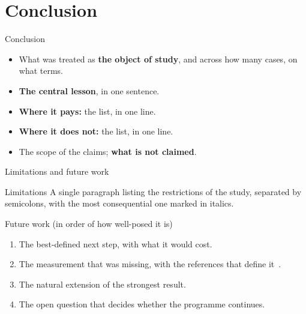 \documentclass[aspectratio=43, 11pt, xcolor=dvipsnames, compress]{beamer}
\renewcommand{\cite}[2][]{\unskip}   %
\begin{document}
\section{Conclusion}
\begin{frame}{Conclusion}
  \small
  \begin{itemize}
    \item What was treated as \textbf{the object of study}, and across how many cases, on what terms.
    \item \textbf{The central lesson}, in one sentence.
    \item \textbf{Where it pays:} the list, in one line.
    \item \textbf{Where it does not:} the list, in one line.
    \item The scope of the claims; \textbf{what is not claimed}.
  \end{itemize}
\end{frame}

\begin{frame}{Limitations and future work}
  \footnotesize
  \begin{block}{Limitations}
    A single paragraph listing the restrictions of the study, separated by semicolons, with the most consequential one marked in italics.
  \end{block}
  \begin{block}{Future work (in order of how well-posed it is)}
    \begin{enumerate}
      \item The best-defined next step, with what it would cost.
      \item The measurement that was missing, with the references that define it~\cite{example_article, example_inproceedings}.
      \item The natural extension of the strongest result.
      \item The open question that decides whether the programme continues.
    \end{enumerate}
  \end{block}
\end{frame}

\end{document}
